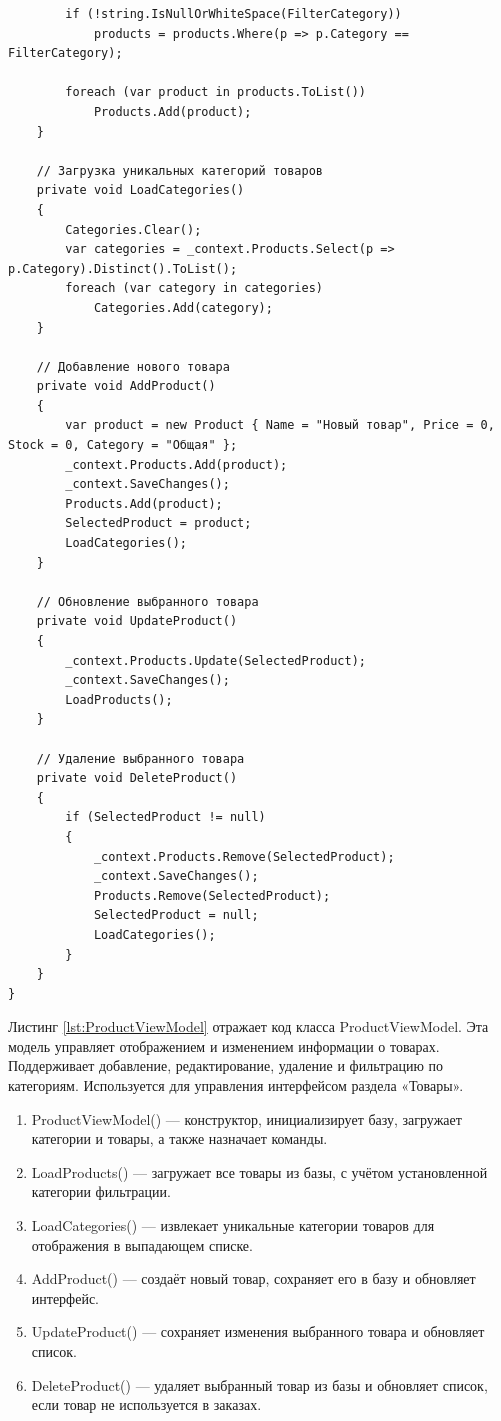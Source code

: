 \documentclass[12pt]{article}
\renewcommand{\texttt}[1]{{\small\ttfamily #1}}
\newenvironment{code}{\captionsetup{type=listing}}{}
\numberwithin{listing}{section}
\numberwithin{figure}{section}
\begin{document}
\begin{code}
\begin{verbatim}
        if (!string.IsNullOrWhiteSpace(FilterCategory))
            products = products.Where(p => p.Category == FilterCategory);

        foreach (var product in products.ToList())
            Products.Add(product);
    }

    // Загрузка уникальных категорий товаров
    private void LoadCategories()
    {
        Categories.Clear();
        var categories = _context.Products.Select(p => p.Category).Distinct().ToList();
        foreach (var category in categories)
            Categories.Add(category);
    }

    // Добавление нового товара
    private void AddProduct()
    {
        var product = new Product { Name = "Новый товар", Price = 0, Stock = 0, Category = "Общая" };
        _context.Products.Add(product);
        _context.SaveChanges();
        Products.Add(product);
        SelectedProduct = product;
        LoadCategories();
    }

    // Обновление выбранного товара
    private void UpdateProduct()
    {
        _context.Products.Update(SelectedProduct);
        _context.SaveChanges();
        LoadProducts();
    }

    // Удаление выбранного товара
    private void DeleteProduct()
    {
        if (SelectedProduct != null)
        {
            _context.Products.Remove(SelectedProduct);
            _context.SaveChanges();
            Products.Remove(SelectedProduct);
            SelectedProduct = null;
            LoadCategories();
        }
    }
}
    \end{verbatim}
	\label{lst:ProductViewModel}
\end{code}
Листинг \ref{lst:ProductViewModel} отражает код класса \texttt{ProductViewModel}. Эта модель управляет отображением и изменением информации о товарах. Поддерживает добавление, редактирование, удаление и фильтрацию по категориям. Используется для управления интерфейсом раздела «Товары».


\begin{enumerate}
	\item \texttt{ProductViewModel()} — конструктор, инициализирует базу, загружает категории и товары, а также назначает команды.
	\item \texttt{LoadProducts()} — загружает все товары из базы, с учётом установленной категории фильтрации.
	\item \texttt{LoadCategories()} — извлекает уникальные категории товаров для отображения в выпадающем списке.
	\item \texttt{AddProduct()} — создаёт новый товар, сохраняет его в базу и обновляет интерфейс.
	\item \texttt{UpdateProduct()} — сохраняет изменения выбранного товара и обновляет список.
	\item \texttt{DeleteProduct()} — удаляет выбранный товар из базы и обновляет список, если товар не используется в заказах.
\end{enumerate}
\end{document}
